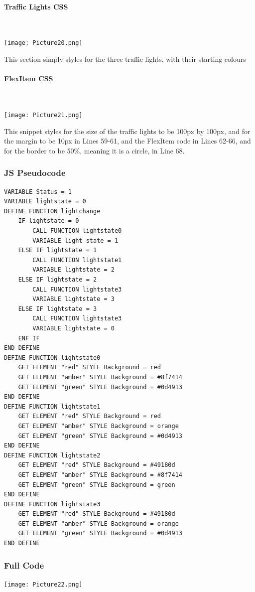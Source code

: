 \documentclass[a4paper]{article}
\begin{document}
\paragraph{Traffic Lights CSS}
~\par
\noindent\texttt{[image: Picture20.png]} \par
This section simply styles for the three traffic lights, with their starting colours
\paragraph{FlexItem CSS}
~\par
\noindent\texttt{[image: Picture21.png]} \par
This snippet styles for the size of the traffic lights to be 100px by 100px, and for the margin to be 10px in Lines 59-61, and the FlexItem code in Lines 62-66, and for the border to be 50\%, meaning it is a circle, in Line 68. \newpage
\subsubsection{JS Pseudocode}	
\begin{lstlisting}
VARIABLE Status = 1
VARIABLE lightstate = 0
DEFINE FUNCTION lightchange
	IF lightstate = 0
		CALL FUNCTION lightstate0
		VARIABLE light state = 1
	ELSE IF lightstate = 1
		CALL FUNCTION lightstate1
		VARIABLE lightstate = 2
	ELSE IF lightstate = 2
		CALL FUNCTION lightstate3
		VARIABLE lightstate = 3
	ELSE IF lightstate = 3
		CALL FUNCTION lightstate3
		VARIABLE lightstate = 0
	ENF IF
END DEFINE
DEFINE FUNCTION lightstate0
	GET ELEMENT "red" STYLE Background = red
	GET ELEMENT "amber" STYLE Background = #8f7414
	GET ELEMENT "green" STYLE Background = #0d4913
END DEFINE
DEFINE FUNCTION lightstate1
	GET ELEMENT "red" STYLE Background = red
	GET ELEMENT "amber" STYLE Background = orange
	GET ELEMENT "green" STYLE Background = #0d4913
END DEFINE
DEFINE FUNCTION lightstate2
	GET ELEMENT "red" STYLE Background = #49180d
	GET ELEMENT "amber" STYLE Background = #8f7414
	GET ELEMENT "green" STYLE Background = green
END DEFINE
DEFINE FUNCTION lightstate3
	GET ELEMENT "red" STYLE Background = #49180d
	GET ELEMENT "amber" STYLE Background = orange
	GET ELEMENT "green" STYLE Background = #0d4913
END DEFINE
\end{lstlisting}
\subsubsection{Full Code}
\noindent\texttt{[image: Picture22.png]} \par
\end{document}
